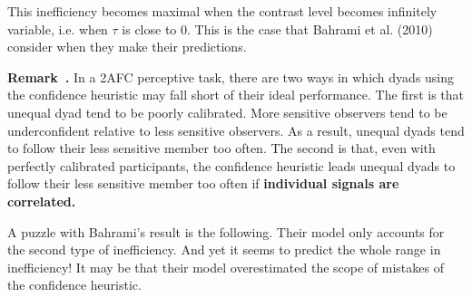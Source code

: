 \documentclass[12pt]{report}
\newcounter{example}[section]
\newenvironment{remark}[1][]{\refstepcounter{example}\par\medskip
   \noindent \textbf{Remark~\theexample. #1} \rmfamily}{\medskip}
\begin{document}
This inefficiency becomes maximal when the contrast level becomes infinitely variable, i.e. when $\tau$ is close to 0. This is the case that Bahrami et al. (2010) consider when they make their predictions. 

\begin{remark}
In a 2AFC perceptive task, there are two ways in which dyads using the confidence heuristic may fall short of their ideal performance. The first is that unequal dyad tend to be poorly calibrated. More sensitive observers tend to be underconfident relative to less sensitive observers. As a result, unequal dyads tend to follow their less sensitive member too often. The second is that, even with perfectly calibrated participants, the confidence heuristic leads unequal dyads to follow their less sensitive member too often if \textbf{individual signals are correlated.}

A puzzle with Bahrami's result is the following. Their model only accounts for the second type of inefficiency. And yet it seems to predict the whole range in inefficiency! It may be that their model overestimated the scope of mistakes of the confidence heuristic.
\end{remark}
\end{document}
